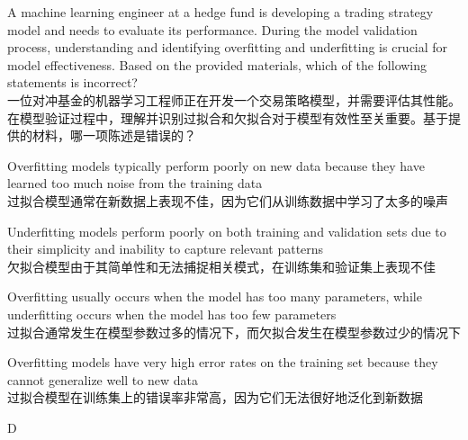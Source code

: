 \documentclass{article}
\newcounter{question} %
\begin{document}
\begin{question}
A machine learning engineer at a hedge fund is developing a trading strategy model and needs to evaluate its performance. During the model validation process, understanding and identifying overfitting and underfitting is crucial for model effectiveness. Based on the provided materials, which of the following statements is incorrect?\\
一位对冲基金的机器学习工程师正在开发一个交易策略模型，并需要评估其性能。在模型验证过程中，理解并识别过拟合和欠拟合对于模型有效性至关重要。基于提供的材料，哪一项陈述是错误的？
\end{question}
\begin{choices}
    \item Overfitting models typically perform poorly on new data because they have learned too much noise from the training data\\
    过拟合模型通常在新数据上表现不佳，因为它们从训练数据中学习了太多的噪声
    \item Underfitting models perform poorly on both training and validation sets due to their simplicity and inability to capture relevant patterns\\
    欠拟合模型由于其简单性和无法捕捉相关模式，在训练集和验证集上表现不佳
    \item Overfitting usually occurs when the model has too many parameters, while underfitting occurs when the model has too few parameters\\
    过拟合通常发生在模型参数过多的情况下，而欠拟合发生在模型参数过少的情况下
    \item Overfitting models have very high error rates on the training set because they cannot generalize well to new data\\
    过拟合模型在训练集上的错误率非常高，因为它们无法很好地泛化到新数据
\end{choices}

\begin{correctanswer}
D
\end{correctanswer}
\end{document}
